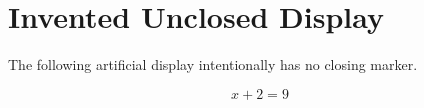 \part*{\texorpdfstring{Invented Unclosed Display}{Invented Unclosed Display}}


\begin{keeptogether}
The following artificial display intentionally has no closing marker.


\[
x + 2 = 9
\]
\end{keeptogether}
